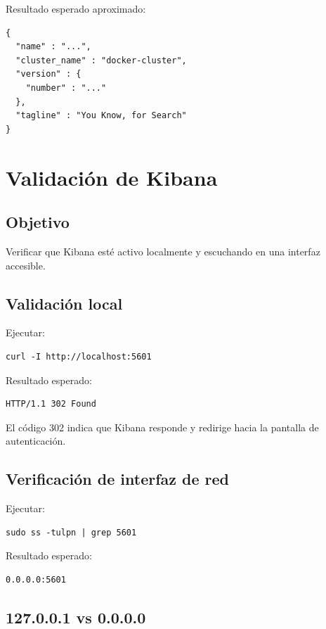 \documentclass[
  coursetitle={Cómputo Nube y Tecnologías Emergentes},
  coursehours={96},
  coursedate={Verano 2026},
  doctype={Práctica},
  otherlangs={english,french},
  authorname={Lázaro},
  authorsurname={Bustio-Martínez},
  authortitle={PhD},
  role={Profesor Investigador},
  email={lbustio@inaoe.mx},
  phone={5559504000},
  ext={7459},
  institution={Instituto Nacional de Astrofísica, Óptica y Electrónica (INAOE)},
  department={Maestría en Ciencias en Tecnologías de Seguridad},
  address={Luis Enrique Erro 1, Sta. Ma. Tonantzintla, San Andrés Cholula, CP 72840, Puebla, México},
  margin={0.5in}
]{../../lbustio_lecture_notes}
\begin{document}
Resultado esperado aproximado:

\begin{verbatim}
{
  "name" : "...",
  "cluster_name" : "docker-cluster",
  "version" : {
    "number" : "..."
  },
  "tagline" : "You Know, for Search"
}
\end{verbatim}

\section{Validación de Kibana}

\subsection{Objetivo}

Verificar que Kibana esté activo localmente y escuchando en una interfaz accesible.

\subsection{Validación local}

Ejecutar:

\begin{lstlisting}
curl -I http://localhost:5601
\end{lstlisting}

Resultado esperado:

\begin{verbatim}
HTTP/1.1 302 Found
\end{verbatim}

El código 302 indica que Kibana responde y redirige hacia la pantalla de autenticación.

\subsection{Verificación de interfaz de red}

Ejecutar:

\begin{lstlisting}
sudo ss -tulpn | grep 5601
\end{lstlisting}

Resultado esperado:

\begin{verbatim}
0.0.0.0:5601
\end{verbatim}

\subsection{127.0.0.1 vs 0.0.0.0}
\end{document}
